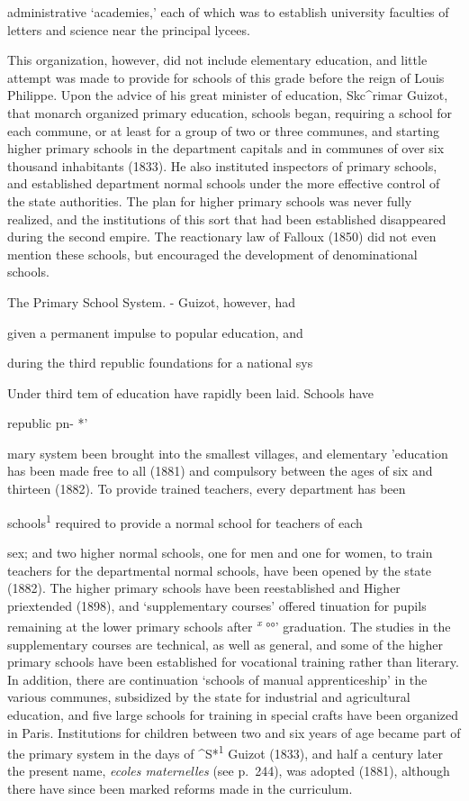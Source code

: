 \documentclass[
]{book}
\begin{document}
administrative `academies,' each of which was to establish university faculties of letters and science near the principal lycees.

This organization, however, did not include elementary education, and little attempt was made to provide for schools of this grade before the reign of Louis Philippe. Upon the advice of his great minister of education, Skc\^{}rimar Guizot, that monarch organized primary education, schools began, requiring a school for each commune, or at least for a group of two or three communes, and starting higher primary schools in the department capitals and in communes of over six thousand inhabitants (1833). He also instituted inspectors of primary schools, and established department normal schools under the more effective control of the state authorities. The plan for higher primary schools was never fully realized, and the institutions of this sort that had been established disappeared during the second empire. The reactionary law of Falloux (1850) did not even mention these schools, but encouraged the development of denominational schools.

The Primary School System. - Guizot, however, had

given a permanent impulse to popular education, and

during the third republic foundations for a national sys

Under third tem of education have rapidly been laid. Schools have

republic pn- *'

mary system been brought into the smallest villages, and elementary 'education has been made free to all (1881) and compulsory between the ages of six and thirteen (1882). To provide trained teachers, every department has been

schools\textsuperscript{1} required to provide a normal school for teachers of each

sex; and two higher normal schools, one for men and one for women, to train teachers for the departmental normal schools, have been opened by the state (1882).\protect\hypertarget{ch25.xmlux5cux23para.460.1.0.box.102.243.1227.901.q.60}{}{ The higher primary schools have been reestablished and Higher priextended (1898), and `supplementary courses' offered tinuation for pupils remaining at the lower primary schools after \emph{\textsuperscript{x}} °°' graduation. The studies in the supplementary courses are technical, as well as general, and some of the higher primary schools have been established for vocational training rather than literary. In addition, there are continuation `schools of manual apprenticeship' in the various communes, subsidized by the state for industrial and agricultural education, and five large schools for training in special crafts have been organized in Paris. Institutions for children between two and six years of age became part of the primary system in the days of \^{}S*\textsuperscript{1} Guizot (1833), and half a century later the present name, \emph{ecoles maternelles} (see p.~244), was adopted (1881), although there have since been marked reforms made in the curriculum.}
\end{document}
